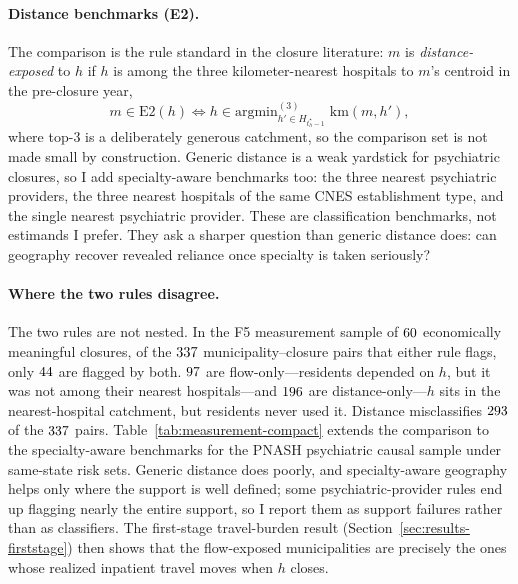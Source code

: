 \paragraph{Distance benchmarks (E2).} The comparison is the rule standard
in the closure literature: $m$ is \emph{distance-exposed} to $h$ if $h$
is among the three kilometer-nearest hospitals to $m$'s centroid in the
pre-closure year,
\begin{equation}
  m \in \mathrm{E2}(h) \iff
  h \in \mathrm{argmin}^{(3)}_{h' \in H_{t_h^{\star} - 1}} \;
  \mathrm{km}(m, h'),
  \label{eq:e2}
\end{equation}
where top-$3$ is a deliberately generous catchment, so the comparison set
is not made small by construction. Generic distance is a weak yardstick
for psychiatric closures, so I add specialty-aware benchmarks too: the
three nearest psychiatric providers, the three nearest hospitals of the
same CNES establishment type, and the single nearest psychiatric
provider. These are classification benchmarks, not estimands I prefer.
They ask a sharper question than generic distance does: can geography
recover revealed reliance once specialty is taken seriously?

\paragraph{Where the two rules disagree.} The two rules are not nested. In
the F5 measurement sample of $\valNexoClosures$ economically meaningful
closures, of the $\valNunionPairs$ municipality--closure pairs that either
rule flags, only $\valNboth$ are flagged by both. $\valNmissed$ are
flow-only---residents depended on $h$, but it was not among their nearest
hospitals---and $\valNfalse$ are distance-only---$h$ sits in the
nearest-hospital catchment, but residents never used it. Distance
misclassifies $\valNmisclass$ of the $\valNunionPairs$ pairs.
Table~\ref{tab:measurement-compact} extends the comparison to the
specialty-aware benchmarks for the PNASH psychiatric causal sample under
same-state risk sets. Generic distance does poorly, and specialty-aware
geography helps only where the support is well defined; some
psychiatric-provider rules end up flagging nearly the entire support, so
I report them as support failures rather than as classifiers. The
first-stage travel-burden result (Section~\ref{sec:results-firststage})
then shows that the flow-exposed municipalities are precisely the ones
whose realized inpatient travel moves when $h$ closes.

